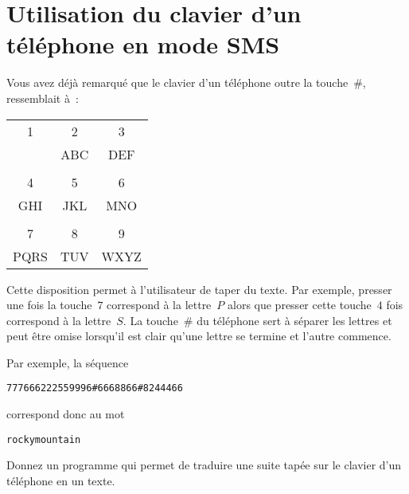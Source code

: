 \section{Utilisation du clavier d'un t\'el\'ephone en mode SMS}
\label{sec:SMS}
  Vous  avez d\'ej\`a  remarqu\'e  que  le clavier d'un  t\'el\'ephone
  outre la touche~\#, ressemblait \`a~:
  \par
  \begin{tabular}{ccc}
    1 &  2  & 3 \\
    & ABC & DEF \\ \\
    4 & 5 & 6 \\
    GHI & JKL & MNO  \\ \\
    7 & 8 & 9 \\
    PQRS &TUV  &WXYZ
  \end{tabular}
  \par
  Cette  disposition permet \`a l'utilisateur de  taper du texte.  Par
  exemple, presser une fois la touche~$7$ correspond \`a la lettre~$P$
  alors  que  presser cette    touche~$4$    fois correspond   \`a  la
  lettre~$S$.  La touche~\# du t\'el\'ephone   sert \`a s\'eparer  les
  lettres  et peut \^etre omise lorsqu'il   est clair qu'une lettre se
  termine et l'autre commence.
  \par
  Par exemple, la s\'equence
\begin{verbatim}
777666222559996#6668866#8244466
\end{verbatim}
  correspond donc au mot
\begin{verbatim}
rockymountain
\end{verbatim}
\begin{exercice}[Question]
  Donnez un programme qui permet de traduire  une suite tap\'ee sur le
  clavier d'un t\'el\'ephone en un texte.
  \ifcorrection
  \begin{correction}
    
  \end{correction}
  \fi
\end{exercice}
%
